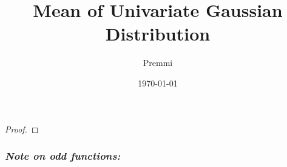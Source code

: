 \documentclass[14pt]{extarticle}
\title{Mean of Univariate Gaussian Distribution}
\author{Premmi}
\date{\today}
\begin{document}
    
\maketitle
\begin{flushleft}	
\begin{proof} 

\end{proof}	
\subsubsection*{\textit{Note on odd functions:}}

\end{flushleft}
\begin{thebibliography}{9}

\end{thebibliography}
\end{document}
